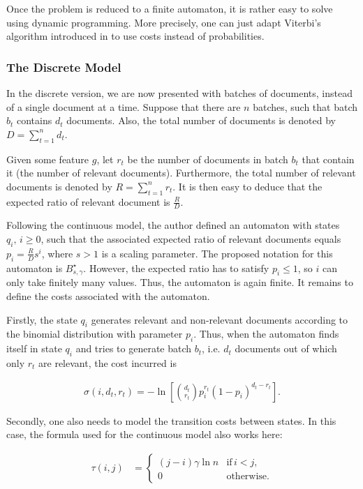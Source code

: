 Once the problem is reduced to a finite automaton, it is rather easy to solve using dynamic programming. More precisely, one can just adapt Viterbi's algorithm introduced in \cite{Viterbi:1054010} to use costs instead of probabilities.

\subsubsection{The Discrete Model}

In the discrete version, we are now presented with batches of documents, instead of a single document at a time. Suppose that there are $n$ batches, such that batch $b_t$ contains $d_t$ documents. Also, the total number of documents is denoted by $\displaystyle D = \sum_{t=1}^n d_t$.

Given some feature $g$, let $r_t$ be the number of documents in batch $b_t$ that contain it (the number of relevant documents). Furthermore, the total number of relevant documents is denoted by $\displaystyle R = \sum_{t=1}^n r_t$. It is then easy to deduce that the expected ratio of relevant document is $\frac{R}{D}$.

Following the continuous model, the author defined an automaton with states $q_i, \, i \geq 0$, such that the associated expected ratio of relevant documents equals $p_i = \frac{R}{D} s^i$, where $s > 1$ is a scaling parameter. The proposed notation for this automaton is $B_{s, \gamma}^{\star}$. However, the expected ratio has to satisfy $p_i \leq 1$, so $i$ can only take finitely many values. Thus, the automaton is again finite. It remains to define the costs associated with the automaton.

Firstly, the state $q_i$ generates relevant and non-relevant documents according to the binomial distribution with parameter $p_i$. Thus, when the automaton finds itself in state $q_i$ and tries to generate batch $b_t$, i.e. $d_t$ documents out of which only $r_t$ are relevant, the cost incurred is

\begin{align}
\label{eq:binomial-distribution}
\sigma \left( i, d_t, r_t \right) = -\ln \left[ \binom{d_t}{r_t} p_i^{r_t} \left( 1 - p_i \right)^{d_t - r_t} \right].
\end{align}

Secondly, one also needs to model the transition costs between states. In this case, the formula used for the continuous model also works here:

\begin{align}
\label{eq:discrete-transition}
\tau \left( i, j \right) &=
	\begin{cases}
		(j - i) \gamma \ln n & \textrm{if} \, i < j, \\
		0 & \textrm{otherwise}.
	\end{cases}
\end{align}

